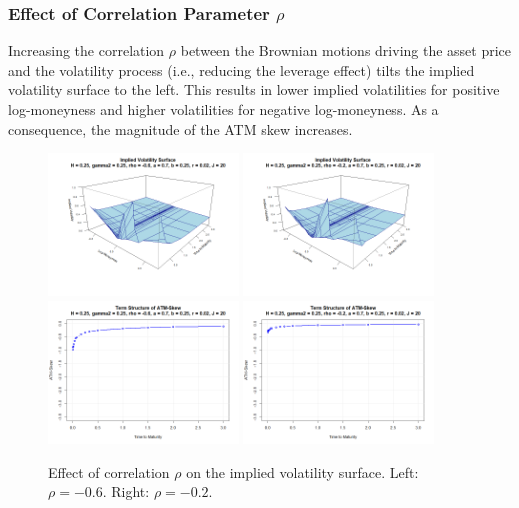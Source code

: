 \subsubsection*{Effect of Correlation Parameter $\rho$}
\begin{minipage}{\textwidth}
Increasing the correlation $\rho$ between the Brownian motions driving the asset price and the volatility process (i.e., reducing the leverage effect) tilts the implied volatility surface to the left. This results in lower implied volatilities for positive log-moneyness and higher volatilities for negative log-moneyness. As a consequence, the magnitude of the ATM skew increases.
\begin{figure}[H]
    \centering
    \includegraphics[width=0.45\textwidth]{figures/5.2 Individual Parameter Effects/rho=-0.6_iv_surface.png}
	\includegraphics[width=0.45\textwidth]{figures/5.2 Individual Parameter Effects/rho=-0.2_iv_surface.png}
	\includegraphics[width=0.45\textwidth]{figures/5.2 Individual Parameter Effects/rho=-0.6_atm_skew.png}
	\includegraphics[width=0.45\textwidth]{figures/5.2 Individual Parameter Effects/rho=-0.2_atm_skew.png}
    \caption{Effect of correlation $\rho$ on the implied volatility surface. Left: $\rho=-0.6$. Right: $\rho=-0.2$.}
    \label{fig:rho_effect}
\end{figure}
\end{minipage}

